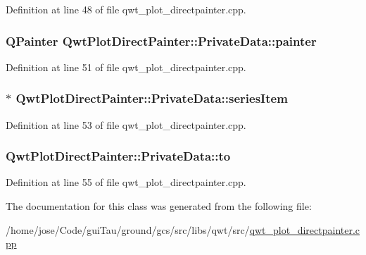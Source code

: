 Definition at line 48 of file qwt\-\_\-plot\-\_\-directpainter.\-cpp.

\hypertarget{class_qwt_plot_direct_painter_1_1_private_data_a130cce4ec8a45c988d75e9bfd96c0420}{
\subsubsection[{painter}]{\setlength{\rightskip}{0pt plus 5cm}Q\-Painter Qwt\-Plot\-Direct\-Painter\-::\-Private\-Data\-::painter}}\label{class_qwt_plot_direct_painter_1_1_private_data_a130cce4ec8a45c988d75e9bfd96c0420}


Definition at line 51 of file qwt\-\_\-plot\-\_\-directpainter.\-cpp.

\hypertarget{class_qwt_plot_direct_painter_1_1_private_data_a1e51aa93d4fd8cad0a6f6e82bf7e19cf}{
\subsubsection[{series\-Item}]{$\ast$ Qwt\-Plot\-Direct\-Painter\-::\-Private\-Data\-::series\-Item}}\label{class_qwt_plot_direct_painter_1_1_private_data_a1e51aa93d4fd8cad0a6f6e82bf7e19cf}


Definition at line 53 of file qwt\-\_\-plot\-\_\-directpainter.\-cpp.

\hypertarget{class_qwt_plot_direct_painter_1_1_private_data_a549ce58b40dba76c27d40291b2c8f214}{
\subsubsection[{to}]{ Qwt\-Plot\-Direct\-Painter\-::\-Private\-Data\-::to}}\label{class_qwt_plot_direct_painter_1_1_private_data_a549ce58b40dba76c27d40291b2c8f214}


Definition at line 55 of file qwt\-\_\-plot\-\_\-directpainter.\-cpp.



The documentation for this class was generated from the following file\-:\begin{DoxyCompactItemize}
\item 
/home/jose/\-Code/gui\-Tau/ground/gcs/src/libs/qwt/src/\hyperlink{qwt__plot__directpainter_8cpp}{qwt\-\_\-plot\-\_\-directpainter.\-cpp}\end{DoxyCompactItemize}
